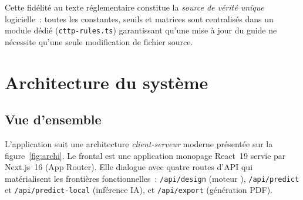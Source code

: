 Cette fidélité au texte réglementaire constitue la \emph{source de vérité
unique} logicielle~: toutes les constantes, seuils et matrices sont
centralisés dans un module dédié (\texttt{cttp-rules.ts}) garantissant
qu'une mise à jour du guide ne nécessite qu'une seule modification de
fichier source.


\section{Architecture du système}
\label{sec:architecture}

\subsection{Vue d'ensemble}
\label{sec:vue-ensemble}

L'application suit une architecture \emph{client-serveur} moderne
présentée sur la figure~\ref{fig:archi}. Le frontal est une application
monopage React~19 servie par Next.js~16 (App Router). Elle dialogue avec
quatre routes d'API qui matérialisent les frontières fonctionnelles~:
\texttt{/api/design} (moteur \cttp{}), \texttt{/api/predict} et
\texttt{/api/predict-local} (inférence IA), et \texttt{/api/export}
(génération PDF).

